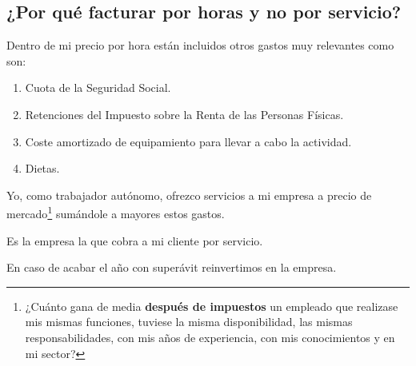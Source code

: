 \subsection{¿Por qué facturar por horas y no por servicio?}

Dentro de mi precio por hora están incluidos otros gastos muy relevantes como son:

\begin{enumerate}
    \item Cuota de la Seguridad Social.
    \item Retenciones del Impuesto sobre la Renta de las Personas Físicas.
    \item Coste amortizado de equipamiento para llevar a cabo la actividad.
    \item Dietas.
\end{enumerate}

Yo, como trabajador autónomo, ofrezco servicios a mi empresa a precio de mercado\footnote{%
    ¿Cuánto gana de media \textbf{después de impuestos} un empleado que realizase mis mismas
    funciones, tuviese la misma disponibilidad, las mismas responsabilidades, con mis años
    de experiencia, con mis conocimientos y en mi sector?
}
sumándole a mayores estos gastos.

Es la empresa la que cobra a mi cliente por servicio.

En caso de acabar el año con superávit reinvertimos en la empresa.
